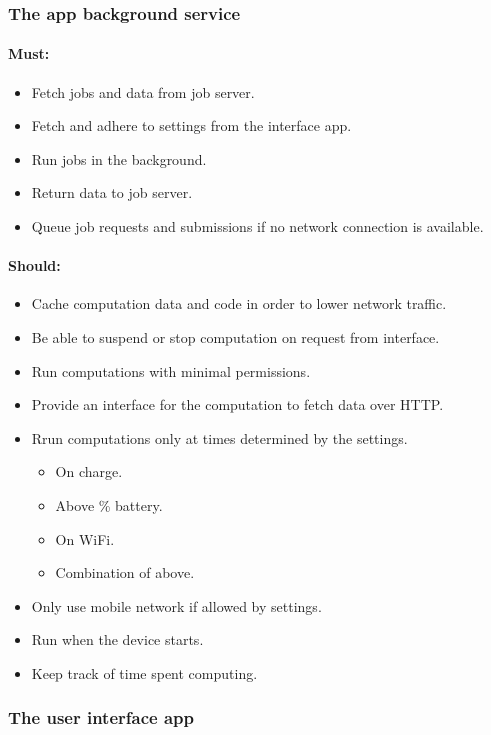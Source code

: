 \documentclass[a4paper,10pt]{article}
\begin{document}
\subsubsection{The app background service}

\paragraph{Must:}

\begin{itemize}
\item Fetch jobs and data from job server.
\item Fetch and adhere to settings from the interface app.
\item Run jobs in the background.
\item Return data to job server.
\item Queue job requests and submissions if no network connection is available.
\end{itemize}

\paragraph{Should:}

\begin{itemize}
\item Cache computation data and code in order to lower network traffic.
\item Be able to suspend or stop computation on request from interface.
\item Run computations with minimal permissions.
\item Provide an interface for the computation to fetch data over HTTP.
\item Rrun computations only at times determined by the settings.
\begin{itemize}
\item On charge.
\item Above \% battery.
\item On WiFi.
\item Combination of above.
\end{itemize}
\item Only use mobile network if allowed by settings.
\item Run when the device starts.
\item Keep track of time spent computing.
\end{itemize}

\subsubsection{The user interface app}
\end{document}
